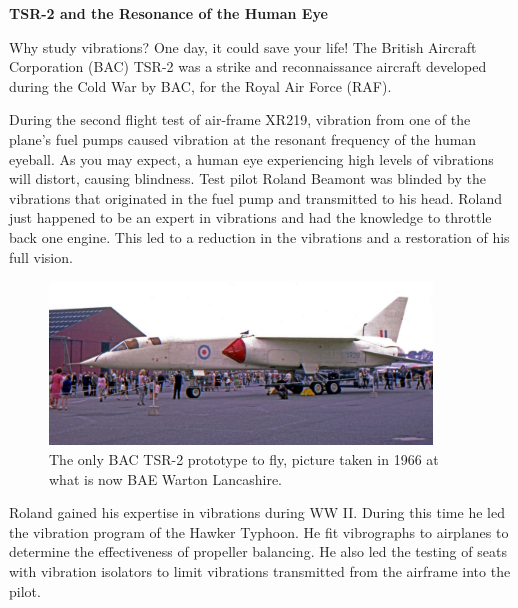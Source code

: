 \documentclass[12pt,letter]{article}
\begin{document}
	\begin{vibration_case_study}
		
			\textbf{TSR-2 and the Resonance of the Human Eye}

		\noindent Why study vibrations? One day, it could save your life! The British Aircraft Corporation (BAC) TSR-2 was a strike and reconnaissance aircraft developed during the Cold War by BAC, for the Royal Air Force (RAF). 
		
		During the second flight test of air-frame XR219, vibration from one of the plane's fuel pumps caused vibration at the resonant frequency of the human eyeball. As you may expect, a human eye experiencing high levels of vibrations will distort, causing blindness. Test pilot Roland Beamont was blinded by the vibrations that originated in the fuel pump and transmitted to his head. Roland just happened to be an expert in vibrations and had the knowledge to throttle back one engine. This led to a reduction in the vibrations and a restoration of his full vision. 

		\begin{figure}[H]
			\centering
			\includegraphics[width=4in]{../figures/TSR_2.jpg}
			\caption{The only BAC TSR-2 prototype to fly, picture taken in 1966 at what is now BAE Warton Lancashire.\protect\footnotemark[1]}
		\end{figure}
				
		Roland gained his expertise in vibrations during WW II. During this time he led the vibration program of the Hawker Typhoon. He fit vibrographs to airplanes to determine the effectiveness of propeller balancing. He also led the testing of seats with vibration isolators to limit vibrations transmitted from the airframe into the pilot. 


	\end{vibration_case_study}
\end{document}
